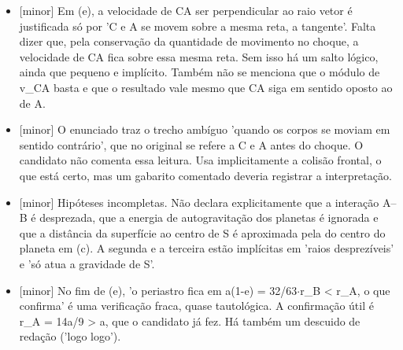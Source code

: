 \documentclass{article}%
\begin{document}
\begin{itemize}%
\item%
{[}minor{]} Em (e), a velocidade de CA ser perpendicular ao raio vetor é justificada só por 'C e A se movem sobre a mesma reta, a tangente'. Falta dizer que, pela conservação da quantidade de movimento no choque, a velocidade de CA fica sobre essa mesma reta. Sem isso há um salto lógico, ainda que pequeno e implícito. Também não se menciona que o módulo de v\_CA basta e que o resultado vale mesmo que CA siga em sentido oposto ao de A.%
\item%
{[}minor{]} O enunciado traz o trecho ambíguo 'quando os corpos se moviam em sentido contrário', que no original se refere a C e A antes do choque. O candidato não comenta essa leitura. Usa implicitamente a colisão frontal, o que está certo, mas um gabarito comentado deveria registrar a interpretação.%
\item%
{[}minor{]} Hipóteses incompletas. Não declara explicitamente que a interação A--B é desprezada, que a energia de autogravitação dos planetas é ignorada e que a distância da superfície ao centro de S é aproximada pela do centro do planeta em (c). A segunda e a terceira estão implícitas em 'raios desprezíveis' e 'só atua a gravidade de S'.%
\item%
{[}minor{]} No fim de (e), 'o periastro fica em a(1-e) = 32/63$\cdot$r\_B < r\_A, o que confirma' é uma verificação fraca, quase tautológica. A confirmação útil é r\_A = 14a/9 > a, que o candidato já fez. Há também um descuido de redação ('logo logo').%
\end{itemize}%
\end{document}
